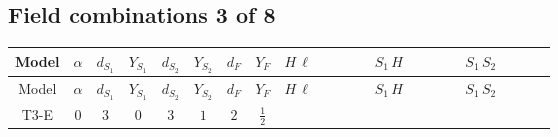 \documentclass[8pt]{article}
\begin{document}
\begin{landscape}
\subsection*{Field combinations 3 of 8}
\begin{longtable}{@{}cccccccc >{\raggedright\arraybackslash}p{0.21\linewidth} >{\raggedright\arraybackslash}p{0.21\linewidth} >{\raggedright\arraybackslash}p{0.21\linewidth}@{}}
\toprule
Model & $\alpha$ & $d_{S_1}$ & $Y_{S_1}$ & $d_{S_2}$ & $Y_{S_2}$ & $d_F$ & $Y_F$ & $H\,\ell$ & $S_1\,H$ & $S_1\,S_2$ \\
\midrule
\endfirsthead
\toprule
Model & $\alpha$ & $d_{S_1}$ & $Y_{S_1}$ & $d_{S_2}$ & $Y_{S_2}$ & $d_F$ & $Y_F$ & $H\,\ell$ & $S_1\,H$ & $S_1\,S_2$ \\
\midrule
\endhead
T3-E & $0$ & $3$ & $0$ & $3$ & $1$ & $2$ & $\frac{1}{2}$ & \scriptsize\adjustbox{max width=\linewidth}{$\begin{gathered} -\frac{2 \sqrt{\frac{2}{3}} \hbar  \overline{y_{1,i_1,r_1}} \overline{y_{2,i_2,r_1}} L_{a_4,i_2}{}^T\, C\, P_L\, L_{a_2,i_1} H_{a_1} H_{a_3} \lambda_5 \epsilon_{a_1,a_2} \epsilon_{a_3,a_4}}{\epsilon  M_F} \\ -\frac{2 \sqrt{\frac{2}{3}} \hbar  \overline{y_{1,i_1,r_1}} \overline{y_{2,i_2,r_1}} L_{a_4,i_2}{}^T\, C\, P_L\, L_{a_2,i_1} H_{a_1} H_{a_3} \lambda_5 \epsilon_{a_1,a_2} \epsilon_{a_3,a_4}}{M_F} \\ -\frac{2 \sqrt{\frac{2}{3}} \hbar  \overline{\lambda_5} \overline{L_{a_3,i_1}}\, C\, P_R\, \overline{L_{a_4,i_2}}{}^T y_{1,i_1,r_1} y_{2,i_2,r_1} \epsilon_{a_1,a_3} \epsilon_{a_2,a_4} H_{a_1}{}^{\dagger } H_{a_2}{}^{\dagger }}{\epsilon  M_F}\end{gathered}$} & \scriptsize\adjustbox{max width=\linewidth}{$\begin{gathered} -\frac{2 \hbar  \overline{y_{1,i_1,r_1}} \overline{Y_{e,i_2,i_3}} H_{a_1} S_{1,j_1} y_{1,i_2,r_1} Y_{e,i_1,i_3} H_{a_1}{}^{\dagger } S_{1,j_1}{}^{\dagger }}{\sqrt{3} \epsilon } \\ -\frac{2 \hbar  \overline{y_{1,i_1,r_1}} \overline{Y_{e,i_2,i_3}} H_{a_1} S_{1,j_1} y_{1,i_2,r_1} Y_{e,i_1,i_3} H_{a_1}{}^{\dagger } S_{1,j_1}{}^{\dagger }}{\sqrt{3}} \\ +\frac{2 i \sqrt{\frac{2}{3}} \hbar  \overline{y_{1,i_1,r_1}} \overline{Y_{e,i_2,i_3}} H_{a_2} S_{1,j_2} y_{1,i_2,r_1} Y_{e,i_1,i_3} H_{a_1}{}^{\dagger } S_{1,j_1}{}^{\dagger } \mathcal{I}_{H1,a_1,a_2,j_1,j_2}{}^1}{\epsilon }\end{gathered}$} & \scriptsize\adjustbox{max width=\linewidth}{$\begin{gathered} -\frac{4 \hbar  \overline{y_{1,i_1,r_1}} \overline{y_{2,i_2,r_2}} S_{1,j_2} S_{2,j_2} y_{1,i_2,r_1} y_{2,i_1,r_2} S_{1,j_1}{}^{\dagger } S_{2,j_1}{}^{\dagger }}{3 \epsilon } \\ -\frac{4}{3} \hbar  \overline{y_{1,i_1,r_1}} \overline{y_{2,i_2,r_1}} S_{1,j_2} S_{2,j_2} y_{1,i_2,r_2} y_{2,i_1,r_2} S_{1,j_1}{}^{\dagger } S_{2,j_1}{}^{\dagger } \\ -\frac{4}{3} \hbar  \overline{y_{1,i_1,r_1}} \overline{y_{2,i_2,r_1}} S_{1,j_2} S_{2,j_2} y_{1,i_1,r_2} y_{2,i_2,r_2} S_{1,j_1}{}^{\dagger } S_{2,j_1}{}^{\dagger }\end{gathered}$} \\

\end{longtable}
\end{landscape}
\end{document}

